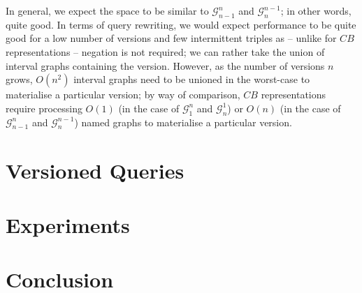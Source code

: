 \documentclass{llncs}
\begin{document}
In general, we expect the space to be similar to $\mathcal{G}^n_{n-1}$ and $\mathcal{G}^{n-1}_n$; in other words, quite good. In terms of query rewriting, we would expect performance to be quite good for a low number of versions and few intermittent triples as -- unlike for $CB$ representations -- negation is not required; we can rather take the union of interval graphs containing the version. However, as the number of versions $n$ grows, $O(n^2)$ interval graphs need to be unioned in the worst-case to materialise a particular version; by way of comparison, $CB$ representations require processing $O(1)$ (in the case of $\mathcal{G}^n_1$ and $\mathcal{G}^1_n$) or $O(n)$ (in the case of $\mathcal{G}^n_{n-1}$ and $\mathcal{G}^{n-1}_n$) named graphs to materialise a particular version. 


\section{Versioned Queries}

\section{Experiments} 

\section{Conclusion}
\newpage


\end{document}
